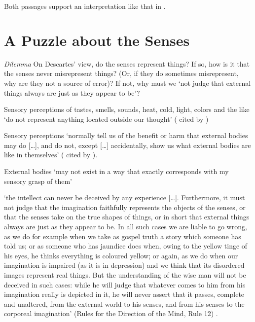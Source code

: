 \documentclass[12pt]{extarticle}
\begin{document}
\begin{multicols*}{3}
Both passages support an interpretation like that in \citet{williams:2014_descartes}.
 
\section{A Puzzle about the Senses}

\emph{Dilemma} On Descartes’ view, do the senses represent things?
If so, how is it that the senses never misrepresent things? (Or, if they do sometimes misrepresent, why are they not a source of error)?
If not, why must we ‘not judge that external things always are just as they appear to be’?

Sensory perceptions of tastes,
smells, sounds, heat, cold, light, colors and the like ‘do not represent
anything located outside our thought’
(\citealp[p.~ 219, AT VIII:35]{descartes:1985_csm1} cited by \citealp[p.~348]{simmons:1999_are})
  
Sensory perceptions ‘normally tell us of the benefit or harm that external bodies may do [\dots], and do not, except [\dots] accidentally, show us what external bodies are like in themselves’ 
(\citealp[p.~224, AT VIII: 41]{descartes:1985_csm1} cited by \citealp[p.~350]{simmons:1999_are}).
 
External bodies 
‘may not exist in a way that 
exactly corresponds with my  sensory grasp of them’
 
‘the intellect can never be deceived by any experience [\dots].
Furthermore, it must not judge that the imagination faithfully represents the objects of
the senses, or that the senses take on the true shapes of things, or in short that
external things always are just as they appear to be. 
In all such cases we are liable to go wrong, as we do for example when we take as gospel
truth a story which someone has told us; or as someone who has jaundice does when, owing
to the yellow tinge of his eyes, he thinks everything is coloured yellow; or again, as we
do when our imagination is impaired (as it is in depression) and we think that its
disordered images represent real things. 
But the understanding of the wise man will not be deceived in such cases: while he will
judge that whatever comes to him from his imagination really is depicted
in it, he will never assert that it passes, complete and unaltered, from the external
world to his senses, and from his senses to the corporeal imagination’
(Rules for the Direction of the Mind, Rule 12)
\citep[p.~47, AT X:423]{descartes:1985_csm1}.
 

\end{multicols*}
\end{document}
